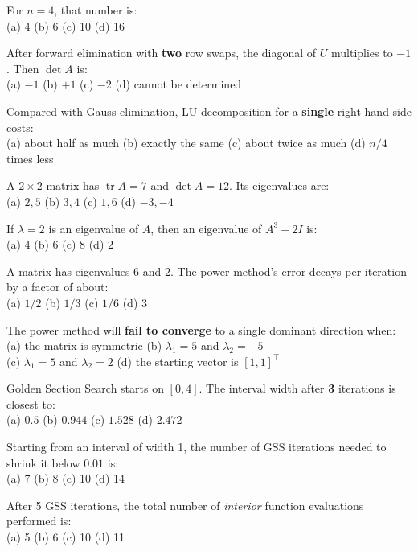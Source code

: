 \begin{mcqbox}
\mq For $n=4$, that number is:\\
(a) 4 \quad (b) 6 \quad (c) 10 \quad (d) 16

\mq After forward elimination with \textbf{two} row swaps, the diagonal of $U$ multiplies to $-1$. Then $\det A$ is:\\
(a) $-1$ \quad (b) $+1$ \quad (c) $-2$ \quad (d) cannot be determined

\mq Compared with Gauss elimination, LU decomposition for a \textbf{single} right-hand side costs:\\
(a) about half as much \quad (b) exactly the same \quad (c) about twice as much \quad (d) $n/4$ times less

\mq A $2\times2$ matrix has $\operatorname{tr}A = 7$ and $\det A = 12$. Its eigenvalues are:\\
(a) $2, 5$ \quad (b) $3, 4$ \quad (c) $1, 6$ \quad (d) $-3, -4$

\mq If $\lambda = 2$ is an eigenvalue of $A$, then an eigenvalue of $A^3 - 2I$ is:\\
(a) $4$ \quad (b) $6$ \quad (c) $8$ \quad (d) $2$

\mq A matrix has eigenvalues $6$ and $2$. The power method's error decays per iteration by a factor of about:\\
(a) $1/2$ \quad (b) $1/3$ \quad (c) $1/6$ \quad (d) $3$

\mq The power method will \textbf{fail to converge} to a single dominant direction when:\\
(a) the matrix is symmetric \quad (b) $\lambda_1 = 5$ and $\lambda_2 = -5$ \\
(c) $\lambda_1 = 5$ and $\lambda_2 = 2$ \quad (d) the starting vector is $[1,1]^\top$

\mq Golden Section Search starts on $[0,4]$. The interval width after \textbf{3} iterations is closest to:\\
(a) $0.5$ \quad (b) $0.944$ \quad (c) $1.528$ \quad (d) $2.472$

\mq Starting from an interval of width 1, the number of GSS iterations needed to shrink it below $0.01$ is:\\
(a) 7 \quad (b) 8 \quad (c) 10 \quad (d) 14

\mq After 5 GSS iterations, the total number of \emph{interior} function evaluations performed is:\\
(a) 5 \quad (b) 6 \quad (c) 10 \quad (d) 11


\end{mcqbox}
